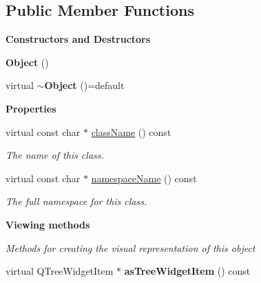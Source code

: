 \subsection*{Public Member Functions}
\begin{Indent}\textbf{ Constructors and Destructors}\par
\begin{DoxyCompactItemize}
\item 
\mbox{\label{classrev_1_1_object_a6fa47dc284dd28320dec49ae18986c8e}} 
{\bfseries Object} ()
\item 
\mbox{\label{classrev_1_1_object_ac534ed7c635fe95fc2de6c7e215b3312}} 
virtual {\bfseries $\sim$\+Object} ()=default
\end{DoxyCompactItemize}
\end{Indent}
\begin{Indent}\textbf{ Properties}\par
\begin{DoxyCompactItemize}
\item 
virtual const char $\ast$ \mbox{\hyperlink{classrev_1_1_object_a7a2013f91169479b65cf93afdc5d9a68}{class\+Name}} () const
\begin{DoxyCompactList}\small\item\em The name of this class. \end{DoxyCompactList}\item 
virtual const char $\ast$ \mbox{\hyperlink{classrev_1_1_object_aaeb638d3e10f361c56c211a318a27f3d}{namespace\+Name}} () const
\begin{DoxyCompactList}\small\item\em The full namespace for this class. \end{DoxyCompactList}\end{DoxyCompactItemize}
\end{Indent}
\begin{Indent}\textbf{ Viewing methods}\par
{\em Methods for creating the visual representation of this object }\begin{DoxyCompactItemize}
\item 
\mbox{\label{classrev_1_1_object_a277188e64a9cf9e2d7364966b3c55266}} 
virtual Q\+Tree\+Widget\+Item $\ast$ {\bfseries as\+Tree\+Widget\+Item} () const
\end{DoxyCompactItemize}
\end{Indent}
